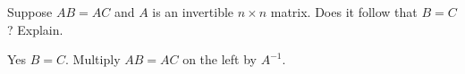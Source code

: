 
\begin{Exercise}[
name={},
title={}, 
difficulty=0,
origin={\cite{KK}}]
Suppose $AB=AC$ and $A$ is an invertible $n\times n$ matrix. Does it
follow that $B=C$? Explain. 
\end{Exercise}

\begin{Answer}
Yes $B=C$. Multiply $AB = AC$ on the left by $A^{-1}$.
\end{Answer}
